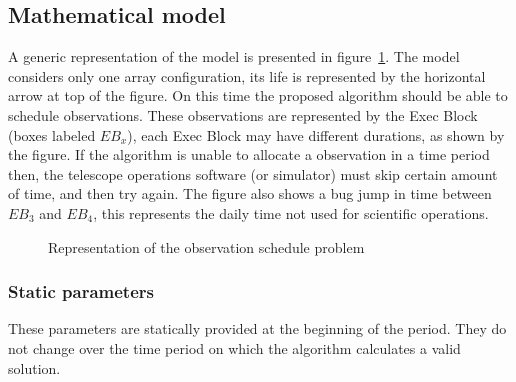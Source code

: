 \subsection{Mathematical model}
\label{sec:array-sched-math-model}
A generic representation of the model is presented in figure~\ref{fig:obs-schedule-representation}. The model considers only one array configuration, its life is represented by the horizontal arrow at top of the figure. On this time the proposed algorithm should be able to schedule observations. These observations are represented by the Exec Block (boxes labeled $EB_x$), each Exec Block may have different durations, as shown by the figure. If the algorithm is unable to allocate a observation in a time period then, the telescope operations software (or simulator) must skip certain amount of time, and then try again. The figure also shows a bug jump in time between $EB_3$ and $EB_4$, this represents the daily time not used for scientific operations.

\begin{figure}
\def\svgwidth{\textwidth}

\caption{Representation of the observation schedule problem}
\label{fig:obs-schedule-representation}
\end{figure}

\subsubsection{Static parameters}
These parameters are statically provided at the beginning of the period. They do not change over the time period on which the algorithm calculates a valid solution.

